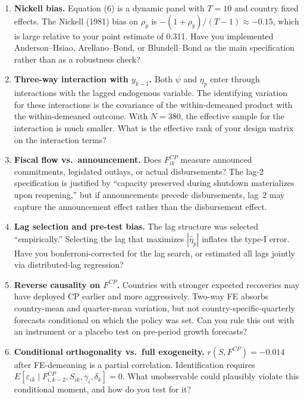 \documentclass[11pt,a4paper]{article}
\begin{document}
\begin{enumerate}
\item \textbf{Nickell bias.} Equation (6) is a dynamic panel with $T=10$ and country fixed effects. The Nickell (1981) bias on $\rho_y$ is $-(1+\rho_y)/(T-1) \approx -0.15$, which is large relative to your point estimate of 0.311. Have you implemented Anderson--Hsiao, Arellano--Bond, or Blundell--Bond as the main specification rather than as a robustness check?

\item \textbf{Three-way interaction with $y_{k-1}$.} Both $\psi$ and $\eta_p$ enter through interactions with the lagged endogenous variable. The identifying variation for these interactions is the covariance of the within-demeaned product with the within-demeaned outcome. With $N=380$, the effective sample for the interaction is much smaller. What is the effective rank of your design matrix on the interaction terms?

\item \textbf{Fiscal flow vs.\ announcement.} Does $F^{CP}_{ik}$ measure announced commitments, legislated outlays, or actual disbursements? The lag-2 specification is justified by ``capacity preserved during shutdown materializes upon reopening,'' but if announcements precede disbursements, lag~2 may capture the announcement effect rather than the disbursement effect.

\item \textbf{Lag selection and pre-test bias.} The lag structure was selected ``empirically.'' Selecting the lag that maximizes $|\hat\eta_p|$ inflates the type-I error. Have you bonferroni-corrected for the lag search, or estimated all lags jointly via distributed-lag regression?

\item \textbf{Reverse causality on $F^{CP}$.} Countries with stronger expected recoveries may have deployed CP earlier and more aggressively. Two-way FE absorbs country-mean and quarter-mean variation, but not country-specific-quarterly forecasts conditional on which the policy was set. Can you rule this out with an instrument or a placebo test on pre-period growth forecasts?

\item \textbf{Conditional orthogonality vs.\ full exogeneity.} $r(S, F^{CP}) = -0.014$ after FE-demeaning is a partial correlation. Identification requires $E[\varepsilon_{ik}\mid F^{CP}_{i,k-2}, S_{ik}, \gamma_i, \delta_k] = 0$. What unobservable could plausibly violate this conditional moment, and how do you test for it?


\end{enumerate}
\end{document}
